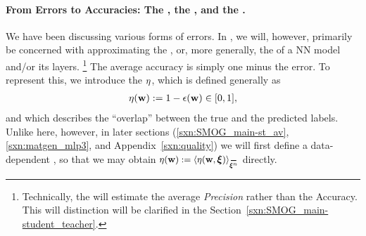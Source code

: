 {\paragraph{From Errors to Accuracies: The \AverageGeneralizationAccuracy, the \Quality, and the \SelfOverlap.}
We have been discussing various forms of errors.
In \SETOL, we will, however, primarily be concerned with approximating the \emph{\AverageGeneralizationAccuracy},
or, more generally, the \Quality of a NN model and/or its layers.
\footnote{Technically, the \Quality will estimate the average \emph{Precision} rather than the Accuracy.
This will distinction will be clarified in the Section~\ref{sxn:SMOG_main-student_teacher}.}
The average accuracy is simply one minus the error.
To represent this,
we introduce the \emph{\SelfOverlap} $\eta$, which is defined generally as
\begin{align}
 \label{eqn:def_eta}
 \eta({\mathbf{w}}) := 1-\epsilon({\mathbf{w}}) \in[0,1] ,
\end{align}
and which 
describes the ``overlap'' between the true and the predicted labels.
Unlike here, however, in later sections
(\ref{sxn:SMOG_main-st_av}, \ref{sxn:matgen_mlp3}, and Appendix~\ref{sxn:quality})
we will first define a data-dependent \SelfOverlap, so that we may obtain
 $\ETA(\WVEC):=\langle\ETA(\WVEC,\XI)\rangle_{\AVGNDXIn}$ directly.


}

